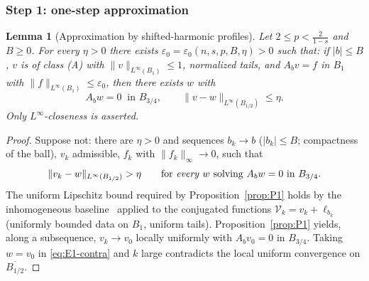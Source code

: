 \documentclass[11pt]{amsart}
\theoremstyle{plain}
\newtheorem{lemma}[theorem]{Lemma}
\theoremstyle{definition}
\theoremstyle{remark}
\begin{document}
\subsubsection*{Step 1: one-step approximation}
\begin{lemma}[Approximation by shifted-harmonic profiles]\label{lem:E1}
Let $2\le p<\frac2{1-s}$ and $B\ge0$. For every $\eta>0$ there exists
$\varepsilon_0=\varepsilon_0(n,s,p,B,\eta)>0$ such that: if $|b|\le B$, $v$
is of class \textnormal{(A)} with $\|v\|_{L^\infty(B_1)}\le1$, normalized
tails, and $A_bv=f$ in $B_1$ with $\|f\|_{L^\infty(B_1)}\le\varepsilon_0$,
then there exists $w$ with
\[
  A_bw=0\ \text{ in }B_{3/4},
  \qquad
  \|v-w\|_{L^\infty(B_{1/2})}\le\eta .
\]
Only $L^\infty$-closeness is asserted.
\end{lemma}
\begin{proof}
Suppose not: there are $\eta>0$ and sequences $b_k\to b$
\textnormal{(}$|b_k|\le B$; compactness of the ball\textnormal{)}, $v_k$
admissible, $f_k$ with $\|f_k\|_\infty\to0$, such that
\begin{equation}\label{eq:E1-contra}
  \|v_k-w\|_{L^\infty(B_{1/2})}>\eta
  \qquad\text{for \emph{every} $w$ solving }A_{b}w=0\text{ in }B_{3/4}.
\end{equation}
The uniform Lipschitz bound required by Proposition~\ref{prop:P1} holds by
the inhomogeneous baseline~\cite{BT} applied to the conjugated functions
$\mathcal V_k=v_k+\ell_{b_k}$ \textnormal{(}uniformly bounded data on
$B_1$, uniform tails\textnormal{)}. Proposition~\ref{prop:P1} yields, along
a subsequence, $v_k\to v_0$ locally uniformly with $A_bv_0=0$ in
$B_{3/4}$. Taking $w=v_0$ in \eqref{eq:E1-contra} and $k$ large contradicts
the local uniform convergence on $\overline{B_{1/2}}$.
\end{proof}
\end{document}
